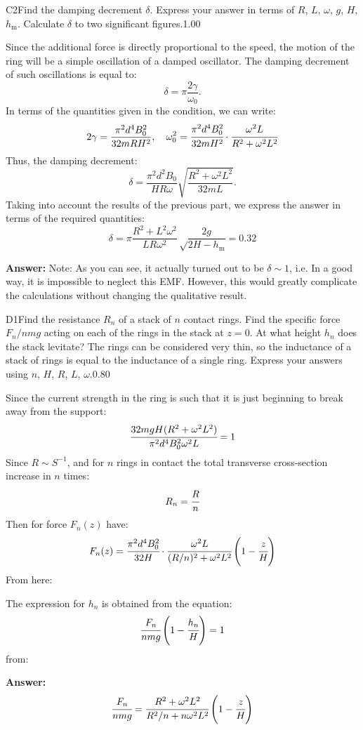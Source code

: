 \documentclass[11pt,a4paper]{article}
\begin{document}
\begin{solcard}{C2}{Find the damping decrement $\delta$. Express your answer in terms of $R$, $L$, $\omega$, $g$, $H$, $h_\mathrm m$. Calculate $\delta$ to two significant figures.}{1.00}

Since the additional force is directly proportional to the speed, the motion of the ring will be a simple oscillation of a damped oscillator. The damping decrement of such oscillations is equal to:\[\delta=\pi\frac{2\gamma}{\omega_0}.\]In terms of the quantities given in the condition, we can write:\[2\gamma=\frac{\pi^2d^4B_0^2}{32m RH^2},\quad\omega_0^2=\cfrac{\pi^2d^4B^2_0}{32mH^2}\cdot\cfrac{\omega^2L}{R^2+\omega^2L^2}\]Thus, the damping decrement:\[\delta=\frac{\pi^2 d^2B_0}{HR\omega}\sqrt{\frac{R^2+\omega^2L^2}{32mL}}.\]Taking into account the results of the previous part, we express the answer in terms of the required quantities:\[\delta=\pi\frac{R^2+L^2\omega^2}{LR\omega^2}\sqrt\frac{2g}{2H-h_\mathrm m}=0.32\]

\par\smallskip\noindent\textbf{Answer:} Note: As you can see, it actually turned out to be $\delta\sim1$, i.e. In a good way, it is impossible to neglect this EMF. However, this would greatly complicate the calculations without changing the qualitative result.
\end{solcard}

\begin{solcard}{D1}{Find the resistance $R_n$ of a stack of $n$ contact rings. Find the specific force $F_n/nmg$ acting on each of the rings in the stack at $z=0$. At what height $h_n$ does the stack levitate? The rings can be considered very thin, so the inductance of a stack of rings is equal to the inductance of a single ring. Express your answers using $n$, $H$, $R$, $L$, $\omega$.}{0.80}

Since the current strength in the ring is such that it is just beginning to break away from the support: $$\cfrac{32mgH(R^2+\omega^2L^2)}{\pi^2d^4B^2_0\omega^2L}=1 $$Since $R\sim S^{-1}$, and for $n$ rings in contact the total transverse cross-section increase in $n$ times: $$R_n=\cfrac{R}{n} $$Then for force $F_n(z)$ have: $$F_n(z)=\cfrac{\pi^2d^4B^2_0}{32H}\cdot\cfrac{\omega^2L}{(R/n)^2+\omega^2L^2}\left(1-\cfrac{z}{H}\right) $$From here:


The expression for $h_n$ is obtained from the equation: $$\cfrac{F_n}{nmg}\left(1-\cfrac{h_n}{H}\right)=1 $$from:

\par\smallskip\noindent\textbf{Answer:} $$\cfrac{F_n}{nmg}=\cfrac{R^2+\omega^2L^2}{R^2/n+n\omega^2L^2}\left(1-\cfrac{z}{H}\right) $$
\end{solcard}
\end{document}
